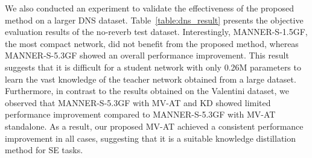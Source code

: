\documentclass[a4paper]{article}
\begin{document}
We also conducted an experiment to validate the effectiveness of the proposed method on a larger DNS dataset. Table~\ref{table:dns_result} presents the objective evaluation results of the no-reverb test dataset. Interestingly, MANNER-S-1.5GF, the most compact network, did not benefit from the proposed method, whereas MANNER-S-5.3GF showed an overall performance improvement. This result suggests that it is difficult for a student network with only 0.26M parameters to learn the vast knowledge of the teacher network obtained from a large dataset. Furthermore, in contrast to the results obtained on the Valentini dataset, we observed that MANNER-S-5.3GF with MV-AT and KD showed limited performance improvement compared to MANNER-S-5.3GF with MV-AT standalone. As a result, our proposed MV-AT achieved a consistent performance improvement in all cases, suggesting that it is a suitable knowledge distillation method for SE tasks.
\begin{table}[th]
\caption{Ablation study for the MANNER-S-1.5GF model with L=3, C=12 using the Valentini dataset.  indicates that dual-depth knowledge transfer is employed.}
\label{table:ablation}
\centering
{}
\end{table}
\end{document}
